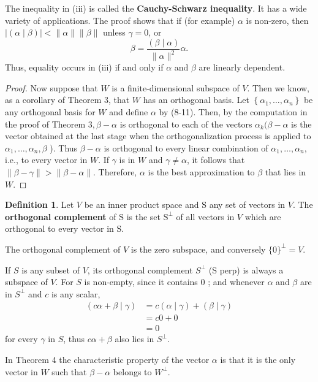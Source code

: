 \documentclass{book}
\theoremstyle{remark}
\theoremstyle{definition}
\newtheorem{definition}{Definition}[section]
\begin{document}
The inequality in (iii) is called the \textbf{Cauchy-Schwarz inequality}. It has a wide variety of applications. The proof shows that if (for example) $\alpha$ is non-zero, then $|(\alpha \mid \beta)|<\|\alpha\|\|\beta\|$ unless $\gamma = 0$, or
$$
\beta=\frac{(\beta \mid \alpha)}{\|\alpha\|^2} \alpha .
$$
Thus, equality occurs in (iii) if and only if $\alpha$ and $\beta$ are linearly dependent.


\begin{proof}
    Now suppose that $W$ is a finite-dimensional subspace of $V$. Then we know, as a corollary of Theorem 3, that $W$ has an orthogonal basis. Let $\left\{\alpha_1, \ldots, \alpha_n\right\}$ be any orthogonal basis for $W$ and define $\alpha$ by (8-11). Then, by the computation in the proof of Theorem $3, \beta-\alpha$ is orthogonal to each of the vectors $\alpha_k(\beta-\alpha$ is the vector obtained at the last stage when the orthogonalization process is applied to $\alpha_1, \ldots, \alpha_n, \beta$ ). Thus $\beta-\alpha$ is orthogonal to every linear combination of $\alpha_1, \ldots, \alpha_n$, i.e., to every vector in $W$. If $\gamma$ is in $W$ and $\gamma \neq \alpha$, it follows that $\|\beta-\gamma\|>\|\beta-\alpha\|$. Therefore, $\alpha$ is the best approximation to $\beta$ that lies in $W$.
\end{proof}

\begin{definition}
    Let $V$ be an inner product space and $\mathrm{S}$ any set of vectors in $V$. The \textbf{orthogonal complement} of $\mathrm{S}$ is the set $\mathrm{S}^{\perp}$ of all vectors in $V$ which are orthogonal to every vector in $\mathrm{S}$.
\end{definition}

The orthogonal complement of $V$ is the zero subspace, and conversely $\{0\}^{\perp}=V$. 

If $S$ is any subset of $V$, its orthogonal complement $S^{\perp}$ (S perp) is always a subspace of $V$. For $S$ is non-empty, since it contains 0 ; and whenever $\alpha$ and $\beta$ are in $S^{\perp}$ and $c$ is any scalar,
$$
\begin{aligned}
(c \alpha+\beta \mid \gamma) & =c(\alpha \mid \gamma)+(\beta \mid \gamma) \\
& =c 0+0 \\
& =0
\end{aligned}
$$
for every $\gamma$ in $S$, thus $c \alpha+\beta$ also lies in $S^{\perp}$. 

In Theorem 4 the characteristic property of the vector $\alpha$ is that it is the only vector in $W$ such that $\beta-\alpha$ belongs to $W^{\perp}$.
\end{document}
